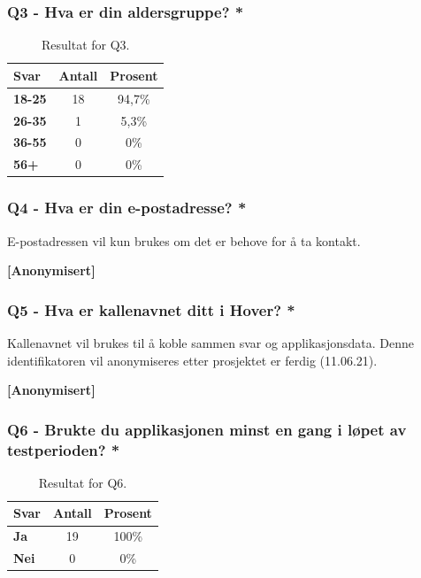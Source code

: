 \subsubsection*{Q3 - Hva er din aldersgruppe? *}
 \begin{table}[H]
    \centering
    \begin{tabularx}{0.4\textwidth}{|>{\bfseries}X|c|c|}

        \hline
        \textbf{Svar} & \textbf{Antall} & \textbf{Prosent}  \\  \hline
18-25 & 18 & 94,7\%  \\ 
26-35 & 1 & 5,3\%  \\ 
36-55 & 0 & 0\%  \\ 
56+ & 0 & 0\% \\ 
         \hline
    \end{tabularx}
    \caption{Resultat for Q3.}
\end{table}

\clearpage
\subsubsection*{Q4 - Hva er din e-postadresse? *}
E-postadressen vil kun brukes om det er behove for å ta kontakt.

\textbf{[Anonymisert]}

\subsubsection*{Q5 - Hva er kallenavnet ditt i Hover? *}
Kallenavnet vil brukes til å koble sammen svar og applikasjonsdata. Denne identifikatoren vil anonymiseres etter prosjektet er ferdig (11.06.21).

\textbf{[Anonymisert]}

\subsubsection*{Q6 - Brukte du applikasjonen minst en gang i løpet av testperioden? *}
 \begin{table}[H]
    \centering
    \begin{tabularx}{0.4\textwidth}{|>{\bfseries}X|c|c|}
        \hline\textbf{Svar} & \textbf{Antall} & \textbf{Prosent}  \\  \hline
        Ja & 19 & 100\%  \\ 
        Nei & 0 & 0\% \\
         \hline
    \end{tabularx}
    \caption{Resultat for Q6.}
\end{table}

